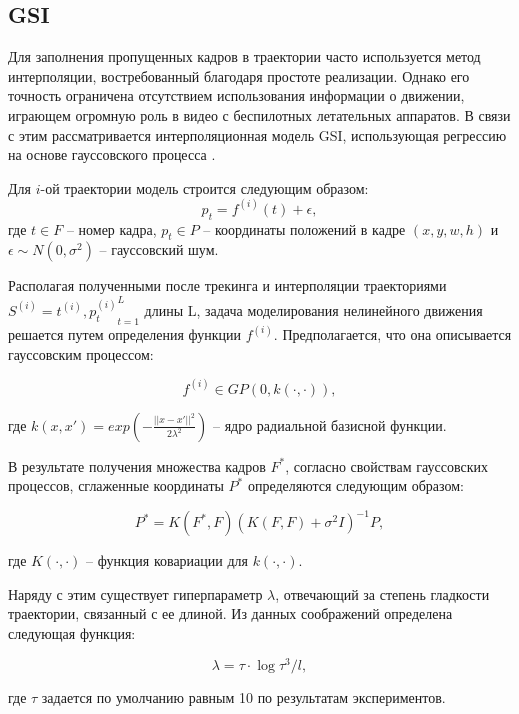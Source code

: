 \subsection{GSI}

Для заполнения пропущенных кадров в траектории часто используется метод интерполяции, востребованный благодаря простоте реализации. Однако его точность ограничена отсутствием использования информации о движении, играющем огромную роль в видео с беспилотных летательных аппаратов. В связи с этим рассматривается интерполяционная модель GSI, использующая регрессию на основе гауссовского процесса \cite{8-1}.

Для $i$-ой траектории модель строится следующим образом:
\begin{equation*}
    p_t = f^{(i)}(t)+\epsilon,
\end{equation*}
где $t \in F$ -- номер кадра, $p_t \in P$ -- координаты положений в кадре $(x, y, w, h)$ и $\epsilon \sim N(0, \sigma^2)$ -- гауссовский шум.

Располагая полученными после трекинга и интерполяции траекториями $S^{(i)}={t^{(i)}, p^{(i)}_t}^L_{t=1}$ длины L, задача моделирования нелинейного движения решается путем определения функции $f^{(i)}$. Предполагается, что она описывается гауссовским процессом:

\begin{equation}
    f^{(i)} \in GP(0, k(\cdot, \cdot)),
\end{equation}

\noindent где $k(x, x')=exp(- \frac{||x-x'||^2}{2 \lambda^2})$ -- ядро радиальной базисной функции.

В результате получения множества кадров $F^*$, согласно свойствам гауссовских процессов, сглаженные координаты $P^*$ определяются следующим образом:

\begin{equation}
    P^*=K(F^*,F)(K(F,F) + \sigma^2 I)^{-1}P,
\end{equation}

\noindent где $K(\cdot, \cdot)$ -- функция ковариации для $k(\cdot, \cdot)$.

Наряду с этим существует гиперпараметр $\lambda$, отвечающий за степень гладкости траектории, связанный с ее длиной. Из данных соображений определена следующая функция:

\begin{equation}
    \lambda = \tau \cdot \log{\tau^3 / l},
\end{equation}

\noindent где $\tau$ задается по умолчанию равным 10 по результатам экспериментов.

